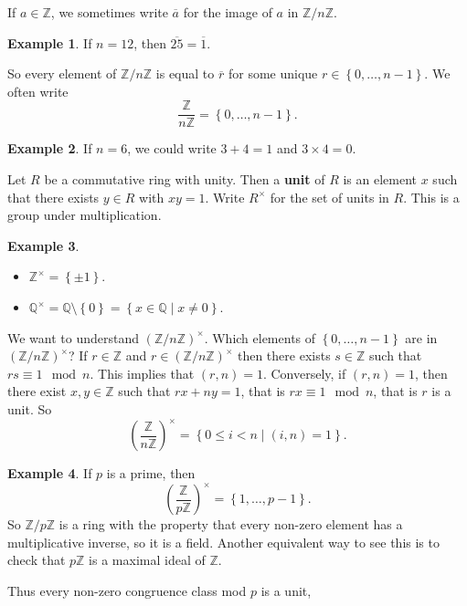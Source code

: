 \documentclass{article}
\newcommand{\Z}{\mathbb{Z}}
\newcommand{\Q}{\mathbb{Q}}
\newcommand{\rb}[1]{\left( #1 \right)}
\newcommand{\cb}[1]{\left\{ #1 \right\}}
\newcommand{\Unit}[1]{\rb{\dfrac{\Z}{#1\Z}}^\times}
\newcommand{\unit}[1]{\rb{\Z / #1\Z}^\times}
\theoremstyle{definition}\newtheorem{definition}{Definition}
\theoremstyle{definition}\newtheorem{remark}[definition]{Remark}
\theoremstyle{definition}\newtheorem*{example}{Example}
\theoremstyle{definition}\newtheorem*{note}{Note}
\begin{document}
If $ a \in \Z $, we sometimes write $ \overline{a} $ for the image of $ a $ in $ \Z / n\Z $.

\begin{example}
If $ n = 12 $, then $ \overline{25} = \overline{1} $.
\end{example}

So every element of $ \Z / n\Z $ is equal to $ \overline{r} $ for some unique $ r \in \cb{0, \dots, n - 1} $. We often write
$$ \dfrac{\Z}{n\Z} = \cb{0, \dots, n - 1}. $$

\begin{example}
If $ n = 6 $, we could write $ 3 + 4 = 1 $ and $ 3 \times 4 = 0 $.
\end{example}

Let $ R $ be a commutative ring with unity. Then a \textbf{unit} of $ R $ is an element $ x $ such that there exists $ y \in R $ with $ xy = 1 $. Write $ R^\times $ for the set of units in $ R $. This is a group under multiplication.

\begin{example}
\hfill
\begin{itemize}
\item $ \Z^\times = \cb{\pm 1} $.
\item $ \Q^\times = \Q \setminus \cb{0} = \cb{x \in \Q \mid x \ne 0} $.
\end{itemize}
\end{example}

We want to understand $ \unit{n} $. Which elements of $ \cb{0, \dots, n - 1} $ are in $ \unit{n} $? If $ r \in \Z $ and $ r \in \unit{n} $ then there exists $ s \in \Z $ such that $ rs \equiv 1 \mod n $. This implies that $ \rb{r, n} = 1 $. Conversely, if $ \rb{r, n} = 1 $, then there exist $ x, y \in \Z $ such that $ rx + ny = 1 $, that is $ rx \equiv 1 \mod n $, that is $ r $ is a unit. So
$$ \Unit{n} = \cb{0 \le i < n \mid \rb{i, n} = 1}. $$

\begin{example}
If $ p $ is a prime, then
$$ \Unit{p} = \cb{1, \dots, p - 1}. $$
So $ \Z / p\Z $ is a ring with the property that every non-zero element has a multiplicative inverse, so it is a field. Another equivalent way to see this is to check that $ p\Z $ is a maximal ideal of $ \Z $.
\end{example}

Thus every non-zero congruence class mod $ p $ is a unit, 

\end{document}
